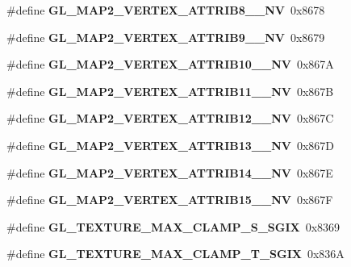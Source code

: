 \begin{DoxyCompactItemize}
\item 
\#define {\bfseries G\+L\+\_\+\+M\+A\+P2\+\_\+\+V\+E\+R\+T\+E\+X\+\_\+\+A\+T\+T\+R\+I\+B8\+\_\+\_\+\+N\+V}~0x8678\label{_s_d_l__opengl_8h_a750015713b5caecb22a3a63e41ee9498}

\item 
\#define {\bfseries G\+L\+\_\+\+M\+A\+P2\+\_\+\+V\+E\+R\+T\+E\+X\+\_\+\+A\+T\+T\+R\+I\+B9\+\_\+\_\+\+N\+V}~0x8679\label{_s_d_l__opengl_8h_a94df31200946f64b8d912a9b936da598}

\item 
\#define {\bfseries G\+L\+\_\+\+M\+A\+P2\+\_\+\+V\+E\+R\+T\+E\+X\+\_\+\+A\+T\+T\+R\+I\+B10\+\_\+\_\+\+N\+V}~0x867\+A\label{_s_d_l__opengl_8h_a23326bbaec470f3a1acc2d05f52ed8cd}

\item 
\#define {\bfseries G\+L\+\_\+\+M\+A\+P2\+\_\+\+V\+E\+R\+T\+E\+X\+\_\+\+A\+T\+T\+R\+I\+B11\+\_\+\_\+\+N\+V}~0x867\+B\label{_s_d_l__opengl_8h_a215ee8ba8a95a4895c75d5dd0be1eb28}

\item 
\#define {\bfseries G\+L\+\_\+\+M\+A\+P2\+\_\+\+V\+E\+R\+T\+E\+X\+\_\+\+A\+T\+T\+R\+I\+B12\+\_\+\_\+\+N\+V}~0x867\+C\label{_s_d_l__opengl_8h_acabe05412382f2200c02030630626e64}

\item 
\#define {\bfseries G\+L\+\_\+\+M\+A\+P2\+\_\+\+V\+E\+R\+T\+E\+X\+\_\+\+A\+T\+T\+R\+I\+B13\+\_\+\_\+\+N\+V}~0x867\+D\label{_s_d_l__opengl_8h_a856d8fd551e839c47e9cc8b05f3658c4}

\item 
\#define {\bfseries G\+L\+\_\+\+M\+A\+P2\+\_\+\+V\+E\+R\+T\+E\+X\+\_\+\+A\+T\+T\+R\+I\+B14\+\_\+\_\+\+N\+V}~0x867\+E\label{_s_d_l__opengl_8h_a8abdb8292534cf5f9d3fe652e9bb8feb}

\item 
\#define {\bfseries G\+L\+\_\+\+M\+A\+P2\+\_\+\+V\+E\+R\+T\+E\+X\+\_\+\+A\+T\+T\+R\+I\+B15\+\_\+\_\+\+N\+V}~0x867\+F\label{_s_d_l__opengl_8h_a69099070a7a15f973823a91845d553cd}

\item 
\#define {\bfseries G\+L\+\_\+\+T\+E\+X\+T\+U\+R\+E\+\_\+\+M\+A\+X\+\_\+\+C\+L\+A\+M\+P\+\_\+\+S\+\_\+\+S\+G\+I\+X}~0x8369\label{_s_d_l__opengl_8h_a28098e27870228808b5730ce9805c0b1}

\item 
\#define {\bfseries G\+L\+\_\+\+T\+E\+X\+T\+U\+R\+E\+\_\+\+M\+A\+X\+\_\+\+C\+L\+A\+M\+P\+\_\+\+T\+\_\+\+S\+G\+I\+X}~0x836\+A\label{_s_d_l__opengl_8h_a22d3f36bbae9c29cfd9df4f445fa24f9}


\end{DoxyCompactItemize}
